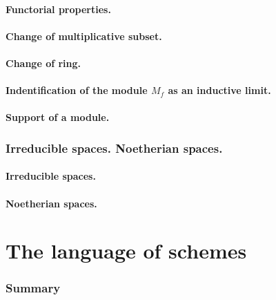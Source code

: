 \documentclass[10pt,oneside]{amsart}
\begin{document}
        \subsection{Functorial properties.}
        

        \subsection{Change of multiplicative subset.}
        

        \subsection{Change of ring.}
        

        \subsection{Indentification of the module $M_f$ as an inductive limit.}
        

        \subsection{Support of a module.}
        

    \section{Irreducible spaces. Noetherian spaces.}

        \subsection{Irreducible spaces.}
        

        \subsection{Noetherian spaces.}
        

\clearpage


\setcounter{subsection}{0}
\part{The language of schemes}
    
    \section*{Summary}
    
\end{document}
